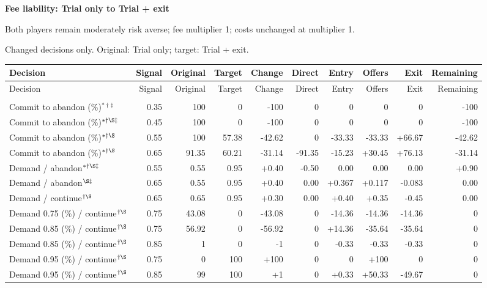 \documentclass[10pt]{article}
\begin{document}
\clearpage
{\large\bfseries Fee liability: Trial only to Trial + exit}\par
Both players remain moderately risk averse; fee multiplier 1; costs unchanged at multiplier 1.\par
{\small Changed decisions only. Original: Trial only; target: Trial + exit.}\par
{\small\setlength{\tabcolsep}{3pt}\begin{longtable}{@{}>{\raggedright\arraybackslash}p{1.65in}rrrrrrrrr@{}}
\toprule Decision & Signal & Original & Target & Change & Direct & Entry & Offers & Exit & Remaining \\\midrule\endfirsthead
\toprule Decision & Signal & Original & Target & Change & Direct & Entry & Offers & Exit & Remaining \\\midrule\endhead
\bottomrule\endfoot
\multicolumn{10}{@{}l}{\textbf{Plaintiff}}\\
Commit to abandon (\%)$^{*\dagger\ddagger}$ & 0.35 & 100 & 0 & -100 & 0 & 0 & 0 & 0 & -100\\
Commit to abandon (\%)$^{*\dagger\S\ddagger}$ & 0.45 & 100 & 0 & -100 & 0 & 0 & 0 & 0 & -100\\
Commit to abandon (\%)$^{*\dagger\S}$ & 0.55 & 100 & 57.38 & -42.62 & 0 & -33.33 & -33.33 & +66.67 & -42.62\\
Commit to abandon (\%)$^{*\dagger\S}$ & 0.65 & 91.35 & 60.21 & -31.14 & -91.35 & -15.23 & +30.45 & +76.13 & -31.14\\
Demand / abandon$^{*\dagger\S\ddagger}$ & 0.55 & 0.55 & 0.95 & +0.40 & -0.50 & 0.00 & 0.00 & 0.00 & +0.90\\
Demand / abandon$^{\S\ddagger}$ & 0.65 & 0.55 & 0.95 & +0.40 & 0.00 & +0.367 & +0.117 & -0.083 & 0.00\\
Demand / continue$^{\dagger\S}$ & 0.65 & 0.65 & 0.95 & +0.30 & 0.00 & +0.40 & +0.35 & -0.45 & 0.00\\
Demand 0.75 (\%) / continue$^{\dagger\S}$ & 0.75 & 43.08 & 0 & -43.08 & 0 & -14.36 & -14.36 & -14.36 & 0\\
Demand 0.85 (\%) / continue$^{\dagger\S}$ & 0.75 & 56.92 & 0 & -56.92 & 0 & +14.36 & -35.64 & -35.64 & 0\\
Demand 0.85 (\%) / continue$^{\dagger\S}$ & 0.85 & 1 & 0 & -1 & 0 & -0.33 & -0.33 & -0.33 & 0\\
Demand 0.95 (\%) / continue$^{\dagger\S}$ & 0.75 & 0 & 100 & +100 & 0 & 0 & +100 & 0 & 0\\
Demand 0.95 (\%) / continue$^{\dagger\S}$ & 0.85 & 99 & 100 & +1 & 0 & +0.33 & +50.33 & -49.67 & 0\\

\end{longtable}}
\end{document}
